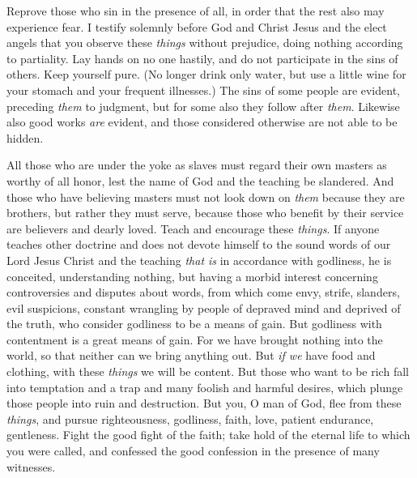 \begin{biblechapter}
\verse Reprove those who sin in the presence of all, in order that the rest also may experience fear.
\verse I testify solemnly before God and Christ Jesus and the elect angels that you observe these \textit{things} without prejudice, doing nothing according to partiality.
\verse Lay hands on no one hastily, and do not participate in the sins of others. Keep yourself pure.
\verse (No longer drink only water, but use a little wine for your stomach and your frequent illnesses.)
\verse The sins of some people are evident, preceding \textit{them} to judgment, but for some also they follow after \textit{them}.
\verse Likewise also good works \textit{are} evident, and those considered otherwise are not able to be hidden.
\end{biblechapter}

\begin{biblechapter} %
 All those who are under the yoke as slaves must regard their own masters as worthy of all honor, lest the name of God and the teaching be slandered.
\verse And those who have believing masters must not look down on \textit{them} because they are brothers, but rather they must serve, because those who benefit by their service are believers and dearly loved.
 Teach and encourage these \textit{things}.
\verse If anyone teaches other doctrine and does not devote himself to the sound words of our Lord Jesus Christ and the teaching \textit{that is} in accordance with godliness,
\verse he is conceited, understanding nothing, but having a morbid interest concerning controversies and disputes about words, from which come envy, strife, slanders, evil suspicions,
\verse constant wrangling by people of depraved mind and deprived of the truth, who consider godliness to be a means of gain.
\verse But godliness with contentment is a great means of gain.
\verse For we have brought nothing into the world, so that neither can we bring anything out.
\verse But \textit{if we} have food and clothing, with these \textit{things} we will be content.
\verse But those who want to be rich fall into temptation and a trap and many foolish and harmful desires, which plunge those people into ruin and destruction.
 But you, O man of God, flee from these \textit{things}, and pursue righteousness, godliness, faith, love, patient endurance, gentleness.
\verse Fight the good fight of the faith; take hold of the eternal life to which you were called, and confessed the good confession in the presence of many witnesses.

\end{biblechapter}
